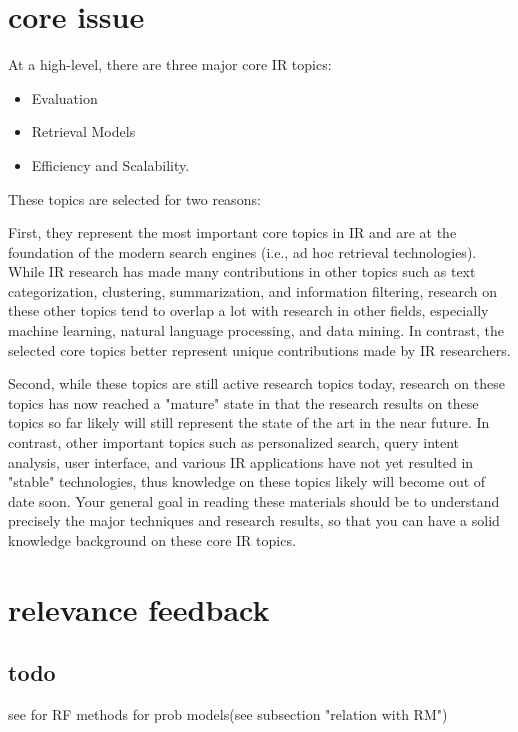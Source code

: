 \documentclass[•]{article}
\begin{document}
\section{core issue}
At a high-level, there are three major core IR topics:\cite{CS598CXZreadings}

\begin{itemize}
\item Evaluation
\item Retrieval Models
\item Efficiency and Scalability. 
\end{itemize}



These topics are selected for two reasons: 

First, they represent the most important core topics in IR and are at the foundation of the modern search engines (i.e., ad hoc retrieval technologies). While IR research has made many contributions in other topics such as text categorization, clustering, summarization, and information filtering, research on these other topics tend to overlap a lot with research in other fields, especially machine learning, natural language processing, and data mining. In contrast, the selected core topics better represent unique contributions made by IR researchers. 

Second, while these topics are still active research topics today, research on these topics has now reached a "mature" state in that the research results on these topics so far likely will still represent the state of the art in the near future. In contrast, other important topics such as personalized search, query intent analysis, user interface, and various IR applications have not yet resulted in "stable" technologies, thus knowledge on these topics likely will become out of date soon. Your general goal in reading these materials should be to understand precisely the major techniques and research results, so that you can have a solid knowledge background on these core IR topics.

\section{relevance feedback}

\subsection{todo}
see \cite{Lv2011} for RF methods for prob models(see subsection "relation with RM")
\end{document}
